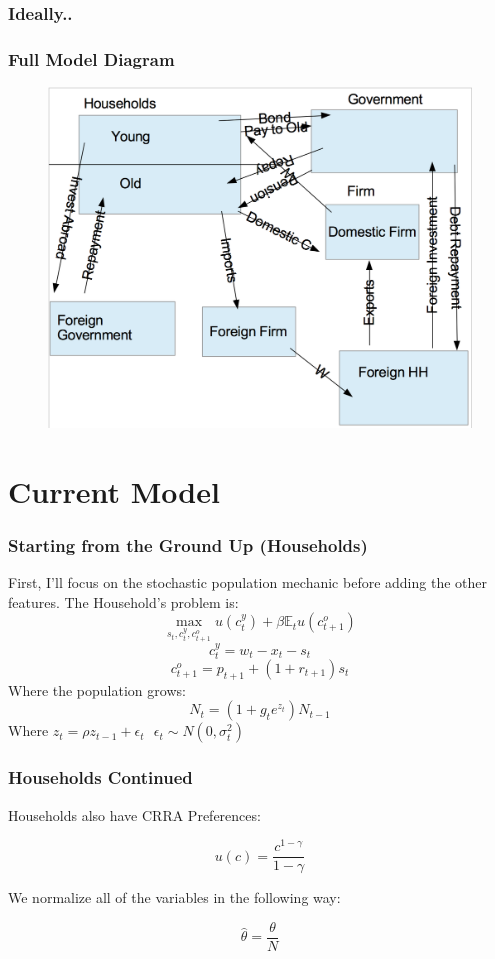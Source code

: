 \documentclass[11pt]{beamer}
\theoremstyle{definition}
\begin{document}
\begin{frame}
    \frametitle{Ideally..}
\frametitle{Full Model Diagram}
\begin{figure}
	\centering
	\includegraphics[scale=0.35]{Full_Model.png}
	\label{V5}
\end{figure}
\end{frame}

\section{Current Model} 
\begin{frame}
    \frametitle{Starting from the Ground Up (Households)}
    First, I'll focus on the stochastic population mechanic before adding the other features. The Household's problem is:
    \[\max_{s_t,c_t^y,c_{t+1}^o} u(c_t^y)+\beta \mathds{E}_t u(c_{t+1}^o)\]
    \[c_t^y = w_t - x_t - s_t\]
    \[c_{t+1}^o = p_{t+1} + (1+r_{t+1}) s_t\]
    Where the population grows:
    \[N_t = (1+g_t e^{z_t}) N_{t-1}\]
    Where $z_t = \rho z_{t-1} + \epsilon_t \text{   }\epsilon_t \sim N(0,\sigma_t^2)$


\end{frame}

\begin{frame}
    \frametitle{Households Continued}
    Households also have CRRA Preferences:

    \begin{equation}
        u(c)=\frac{c^{1-\gamma}}{1-\gamma}
    \end{equation}

    We normalize all of the variables in the following way:

     \[\hat{\theta}=\frac{\theta}{N}\]


\end{frame}
\end{document}
